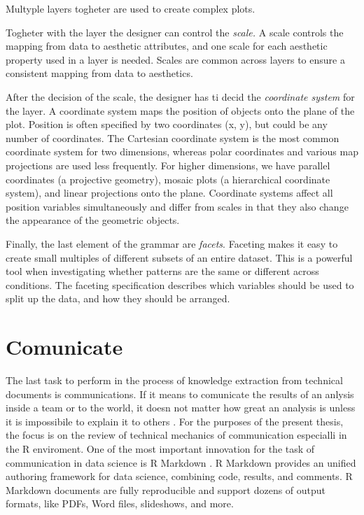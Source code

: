 \documentclass[]{book}
\begin{document}
Multyple layers togheter are used to create complex plots.

Togheter with the layer the designer can control the \emph{scale.} A
scale controls the mapping from data to aesthetic attributes, and one
scale for each aesthetic property used in a layer is needed. Scales are
common across layers to ensure a consistent mapping from data to
aesthetics.

After the decision of the scale, the designer has ti decid the
\emph{coordinate system} for the layer. A coordinate system maps the
position of objects onto the plane of the plot. Position is often
specified by two coordinates (x, y), but could be any number of
coordinates. The Cartesian coordinate system is the most common
coordinate system for two dimensions, whereas polar coordinates and
various map projections are used less frequently. For higher dimensions,
we have parallel coordinates (a projective geometry), mosaic plots (a
hierarchical coordinate system), and linear projections onto the plane.
Coordinate systems affect all position variables simultaneously and
differ from scales in that they also change the appearance of the
geometric objects.

Finally, the last element of the grammar are \emph{facets}. Faceting
makes it easy to create small multiples of different subsets of an
entire dataset. This is a powerful tool when investigating whether
patterns are the same or different across conditions. The faceting
specification describes which variables should be used to split up the
data, and how they should be arranged.

\section{Comunicate}\label{sotatoolscomunicate}

The last task to perform in the process of knowledge extraction from
technical documents is communications. If it means to comunicate the
results of an anlysis inside a team or to the world, it doesn not matter
how great an analysis is unless it is impossibile to explain it to
others \citep{wickham2016r}. For the purposes of the present thesis, the
focus is on the review of technical mechanics of communication
especialli in the R \citep{R-base} enviroment. One of the most important
innovation for the task of communication in data science is R Markdown
\citep{R-rmarkdown}. R Markdown provides an unified authoring framework
for data science, combining code, results, and comments. R Markdown
documents are fully reproducible and support dozens of output formats,
like PDFs, Word files, slideshows, and more.
\end{document}
